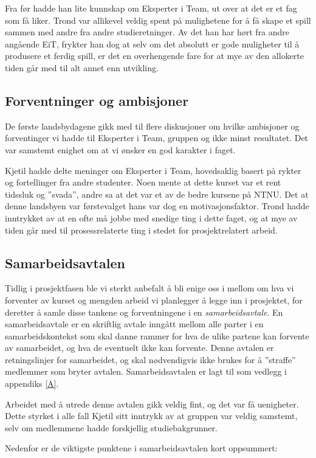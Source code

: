 	Fra før hadde han lite kunnskap om Eksperter i Team, ut over at det er et fag som få liker. Trond var allikevel veldig spent på mulighetene for å få skape et spill sammen med andre fra andre studieretninger. Av det han har hørt fra andre angående EiT, frykter han dog at selv om det absolutt er gode muligheter til å produsere et ferdig spill, er det en overhengende fare for at mye av den allokerte tiden går med til alt annet enn utvikling.


\subsection{Forventninger og ambisjoner}
De første landsbydagene gikk med til flere diskusjoner om hvilke ambisjoner og forventinger vi hadde til Eksperter i Team, gruppen og ikke minst resultatet. Det var samstemt enighet om at vi ønsker en god karakter i faget.

Kjetil hadde delte meninger om Eksperter i Team, hovedsaklig basert på rykter og fortellinger fra andre studenter. Noen mente at dette kurset var et rent tidssluk og ''svada'', andre sa at det var et av de bedre kursene på NTNU. Det at denne landsbyen var førstevalget hans var dog en motivasjonsfaktor. Trond hadde inntrykket av at en ofte må jobbe med snedige ting i dette faget, og at mye av tiden går med til prosessrelaterte ting i stedet for prosjektrelatert arbeid.

\subsection{Samarbeidsavtalen}
Tidlig i prosjektfasen ble vi sterkt anbefalt å bli enige oss i mellom om hva vi forventer av kurset og mengden arbeid vi planlegger å legge inn i prosjektet, for deretter å samle disse tankene og forventningene i en \emph{samarbeidsavtale}. En samarbeidsavtale er en skriftlig avtale inngått mellom alle parter i en samarbeidskontekst som skal danne rammer for hva de ulike partene kan forvente av samarbeidet, og hva de eventuelt ikke kan forvente. Denne avtalen er retningslinjer for samarbeidet, og skal nødvendigvis ikke brukes for å ''straffe'' medlemmer som bryter avtalen. Samarbeidsavtalen er lagt til som vedlegg i appendiks \ref{A}.

Arbeidet med å utrede denne avtalen gikk veldig fint, og det var få uenigheter. Dette styrket i alle fall Kjetil sitt inntrykk av at gruppen var veldig samstemt, selv om medlemmene hadde forskjellig studiebakgrunner.

Nedenfor er de viktigste punktene i samarbeidsavtalen kort oppsummert:

